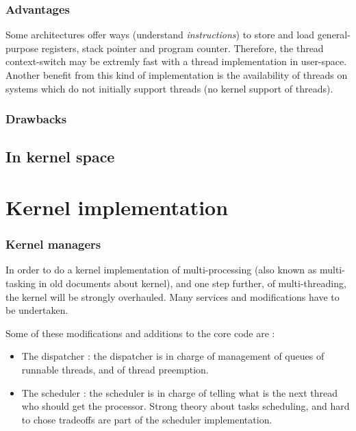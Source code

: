 
\begin{frame}
  \frametitle{Advantages}

Some architectures offer ways (understand \textit{instructions}) to store and load general-purpose registers, stack pointer and program counter. Therefore, the thread context-switch may be extremly fast with a thread implementation in user-space. Another benefit from this kind of implementation is the availability of threads on systems which do not initially support threads (no kernel support of threads).

\end{frame}


\begin{frame}
  \frametitle{Drawbacks}

\end{frame}

\subsection{In kernel space}

%
%

\section{Kernel implementation}


\begin{frame}
  \frametitle{Kernel managers}

In order to do a kernel implementation of multi-processing (also known as multi-tasking in old documents about kernel), and one step further, of multi-threading, the kernel will be strongly overhauled. Many services and modifications have to be undertaken.

\-

Some of these modifications and additions to the core code are :

\begin{itemize}
\item
The dispatcher : the dispatcher is in charge of management of queues of runnable threads, and of thread preemption.

\item
The scheduler : the scheduler is in charge of telling what is the next thread who should get the processor. Strong theory about tasks scheduling, and hard to chose tradeoffs are part of the scheduler implementation.

\end{itemize}

\end{frame}


